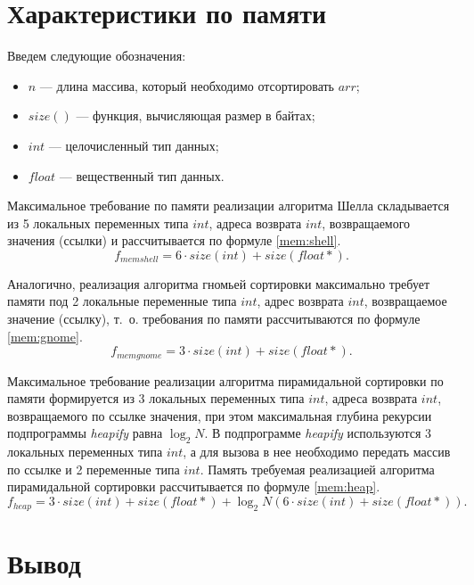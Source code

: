 \section{Характеристики по памяти}

Введем следующие обозначения:
\begin{itemize}
	\item $n$ --- длина массива, который необходимо отсортировать $arr$;
	\item $size()$ --- функция, вычисляющая размер в байтах;
	\item $int$ --- целочисленный тип данных;
	\item $float$ --- вещественный тип данных.
\end{itemize}

Максимальное требование по памяти реализации алгоритма Шелла складывается из 5 локальных переменных типа $int$, адреса возврата $int$, возвращаемого значения (ссылки) и рассчитывается по формуле \eqref{mem:shell}.
\begin{equation}
	\label{mem:shell}
	f_{memshell} = 6 \cdot size(int) + size(float *).
\end{equation}

Аналогично, реализация алгоритма гномьей сортировки максимально требует памяти под 2 локальные переменные типа $int$, адрес возврата $int$, возвращаемое значение (ссылку), т.~о. требования по памяти рассчитываются по формуле \eqref{mem:gnome}.
\begin{equation}
	\label{mem:gnome}
	f_{memgnome} = 3 \cdot size(int) + size(float *).
\end{equation}

Максимальное требование реализации алгоритма пирамидальной сортировки по памяти формируется из 3 локальных переменных типа $int$, адреса возврата $int$, возвращаемого по ссылке значения, при этом максимальная глубина рекурсии подпрограммы \textit{heapify} равна $\log_2 N$. 
В подпрограмме \textit{heapify} используются 3 локальных переменных типа $int$, а для вызова в нее необходимо передать массив по ссылке и 2 переменные типа $int$. 
Память требуемая реализацией алгоритма пирамидальной сортировки рассчитывается по формуле \eqref{mem:heap}.
\begin{equation}
	\label{mem:heap}
	f_{heap} = 3 \cdot size(int) + size(float *) + \log_2 N (6 \cdot size(int) + size(float *)).
\end{equation}

\section*{Вывод}

